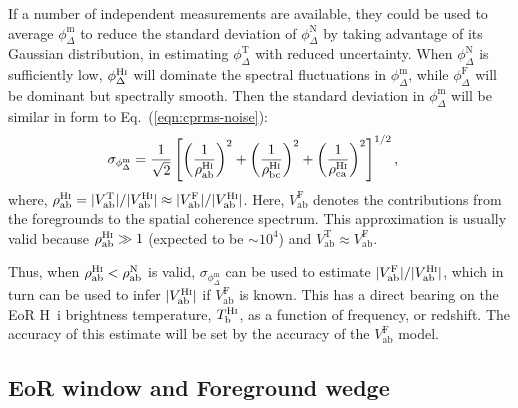 \documentclass[
reprint,
superscriptaddress,
amsmath,
amssymb,
aps,
prd
]{revtex4-1}
\begin{document}
If a number of independent measurements are available, they could be used to average $\phi_\Delta^\textrm{m}$ to reduce the standard deviation of $\phi_\Delta^\textrm{N}$ by taking advantage of its Gaussian distribution, in estimating $\phi_\Delta^\textrm{T}$ with reduced uncertainty. When $\phi_\Delta^\textrm{N}$ is sufficiently low, $\phi_\Delta^\textrm{H{\sc i}}$ will dominate the spectral fluctuations in $\phi_\Delta^\textrm{m}$, while $\phi_\Delta^\textrm{F}$ will be dominant but spectrally smooth. Then the standard deviation in $\phi_\Delta^\textrm{m}$ will be similar in form to Eq.~(\ref{eqn:cprms-noise}):
\begin{align}
  \sigma_{\phi_\Delta^\textrm{m}} &= \frac{1}{\sqrt{2}}\left[\left(\frac{1}{\rho_\textrm{ab}^\textrm{H{\sc i}}}\right)^2 + \left(\frac{1}{\rho_\textrm{bc}^\textrm{H{\sc i}}}\right)^2 + \left(\frac{1}{\rho_\textrm{ca}^\textrm{H{\sc i}}}\right)^2\right]^{1/2}, \label{eqn:cprms-EoR}
\end{align}
where, $\rho_\textrm{ab}^\textrm{H{\sc i}} = |V_\textrm{ab}^\textrm{T}|/|V_\textrm{ab}^\textrm{H{\sc i}}| \approx |V_\textrm{ab}^\textrm{F}|/|V_\textrm{ab}^\textrm{H{\sc i}}|$. Here, $V_\textrm{ab}^\textrm{F}$ denotes the contributions from the foregrounds to the spatial coherence spectrum. This approximation is usually valid because $\rho_\textrm{ab}^\textrm{H{\sc i}} \gg 1$ (expected to be $\sim 10^4$) and $V_\textrm{ab}^\textrm{T} \approx V_\textrm{ab}^\textrm{F}$. 

Thus, when $\rho_\textrm{ab}^\textrm{H{\sc i}} < \rho_\textrm{ab}^\textrm{N}$ is valid, $\sigma_{\phi_\Delta^\textrm{m}}$ can be used to estimate $|V_\textrm{ab}^\textrm{F}|/|V_\textrm{ab}^\textrm{H{\sc i}}|$, which in turn can be used to infer $|V_\textrm{ab}^\textrm{H{\sc i}}|$ if $V_\textrm{ab}^\textrm{F}$ is known. This has a direct bearing on the EoR H~{\sc i} brightness temperature, $T_\textrm{b}^\textrm{H{\sc i}}$, as a function of frequency, or redshift. The accuracy of this estimate will be set by the accuracy of the $V_\textrm{ab}^\textrm{F}$ model.


\subsection{EoR window and Foreground wedge}\label{sec:cp-FG-wedge}
\end{document}
